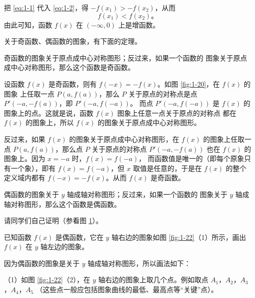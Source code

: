 把 \eqref{eq:1-1} 代入  \eqref{eq:1-2}，得 $-f(x_1) > -f(x_2)$，从而
$$f(x_1) < f(x_2) \text{。}$$
由此可知，函数 $f(x)$ 在 $(-\infty, 0)$ 上是增函数。

关于奇函数、偶函数的图象，有下面的定理。

\begin{theorem}
    奇函数的图象关于原点成中心对称图形；反过来，如果一个函数的
    图象关于原点成中心对称图形，那么这个函数是奇函数。
\end{theorem}

\zhengming 设函数 $f(x)$ 是奇函数，则有 $f(-x) = -f(x)$。如图 \ref{fig:1-20}，在 $f(x)$ 的图象
上任取一点 $P(a, f(a))$，那么 $P$ 关于原点的对称点是点 $P'(-a, -f(a))$，即 $P'(-a, f(-a))$。
而点 $P'(-a, f(-a))$ 是 $f(x)$ 的图象上的点。这就是说，函数 $f(x)$ 图象上任意一点关于原点的对称点
都在 $f(x)$ 的图象上，所以 $f(x)$ 的图象关于原点成中心对称图形。

\begin{figure}[htbp]
    \centering
    \begin{minipage}{8cm}
    \centering
    
    \caption{}\label{fig:1-20}
    \end{minipage}
    \qquad
    \begin{minipage}{8cm}
    \centering
    
    \caption{}\label{fig:1-21}
    \end{minipage}
\end{figure}

反过来，如果 $f(x)$ 的图象关于原点成中心对称图形，在 $f(x)$ 的图象上任取一点 $P(a, f(a))$，那么点
$P$ 关于原点的对称点 $P'(-a, -f(a))$ 也在 $f(x)$ 的图象上。因为 $x = -a$ 时，$f(x) = f(-a)$，
而函数值是唯一的（即每个原象只有一个象），即有 $f(x) = f(-a)$，但 $x$ 取值是任意的，于是在 $f(x)$
的整个定义域内都有 $f(-x) = -f(x)$。从而 $f(x)$ 是奇函数。

\begin{theorem}
    偶函数的图象关于 $y$ 轴成轴对称图形；反过来，如果一个函数的
    图象关于 $y$ 轴成轴对称图形，那么这个函数是偶函数。
\end{theorem}

请同学们自己证明（参看图 \ref{fig:1-21}）。

\liti 已知函数 $f(x)$ 是偶函数，它在 $y$ 轴右边的图象如图 \ref{fig:1-22}（1）所示，画出 $f(x)$ 在 $y$ 轴左边的图象。

\jie 因为偶函数的图象是关于 $y$ 轴成轴对称图形，所以画法如下：

（1）如图 \ref{fig:1-22}（2），在 $y$ 轴右边的图象上取几个点。例如取点 $A_1$，$A_2$，$A_3$，$A_4$，$A_5$
（这些点一般应包括图象曲线的最低、最高点等“关键”点）。

